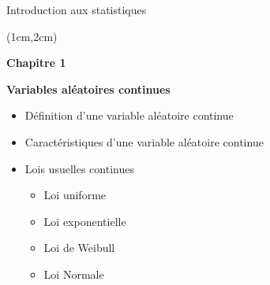 \documentclass{beamer}
\begin{document}
    

\begin{frame}{Introduction aux statistiques}
\begin{textblock*}{\textwidth}(1cm,2cm)

\begin{center}{\bf \Large Chapitre 1} \end{center}
\begin{center}{\bf \Large Variables aléatoires continues} \end{center}
\vspace{0.3cm}
\begin{itemize}
\item Définition d'une variable aléatoire continue 
\item Caractéristiques d'une variable aléatoire continue
\item Lois usuelles continues
\begin{itemize}
\item Loi uniforme
\item Loi exponentielle
\item Loi de Weibull
\item Loi Normale 
\end{itemize}
\end{itemize}

 \end{textblock*}

\end{frame}    
    
\end{document}
